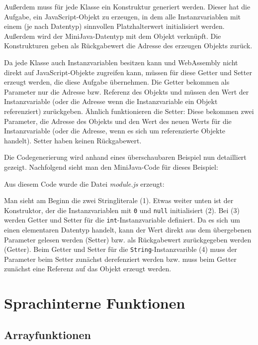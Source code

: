 Außerdem muss für jede Klasse ein Konstruktur generiert werden. Dieser hat die Aufgabe, ein JavaScript-Objekt zu erzeugen, in dem alle Instanzvariablen mit einem (je nach Datentyp) sinnvollen Platzhalterwert initialisiert werden. Außerdem wird der MiniJava-Datentyp mit dem Objekt verknüpft. Die Konstrukturen geben als Rückgabewert die Adresse des erzeugen Objekts zurück.

Da jede Klasse auch Instanzvariablen besitzen kann und WebAssembly nicht direkt auf JavaScript-Objekte zugreifen kann, müssen für diese Getter und Setter erzeugt werden, die diese Aufgabe übernehmen. Die Getter bekommen als Parameter nur die Adresse bzw. Referenz des Objekts und müssen den Wert der Instanzvariable (oder die Adresse wenn die Instanzvariable ein Objekt referenziert) zurückgeben. Ähnlich funktionieren die Setter: Diese bekommen zwei Parameter, die Adresse des Objekts und den Wert des neuen Werts für die Instanzvariable (oder die Adresse, wenn es sich um referenzierte Objekte handelt). Setter haben keinen Rückgabewert.

Die Codegenerierung wird anhand eines überschaubaren Beispiel nun detailliert gezeigt. Nachfolgend sieht man den MiniJava-Code für dieses Beispiel:



Aus diesem Code wurde die Datei \emph{module.js} erzeugt:



Man sieht am Beginn die zwei Stringliterale (1). Etwas weiter unten ist der Konstruktor, der die Instanzvariablen mit \lstinline{0} und \lstinline{null} initialisiert (2). Bei (3) werden Getter und Setter für die \lstinline{int}-Instanzvariable definiert. Da es sich um einen elementaren Datentyp handelt, kann der Wert direkt aus dem übergebenen Parameter gelesen werden (Setter) bzw. als Rückgabewert zurückgegeben werden (Getter). Beim Getter und Setter für die \lstinline{String}-Instanzvarible (4) muss der Parameter beim Setter zunächst derefenziert werden bzw. muss beim Getter zunächst eine Referenz auf das Objekt erzeugt werden.

\section{Sprachinterne Funktionen}
\subsection{Arrayfunktionen}

